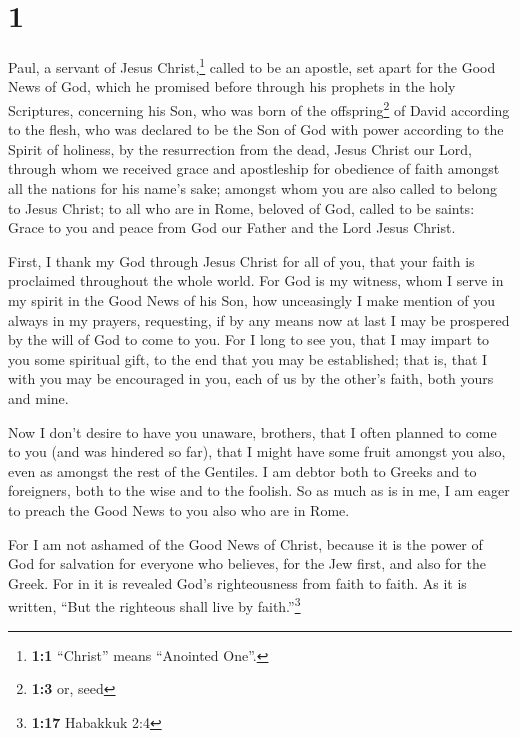 \hypertarget{section}{%
\section{1}\label{section}}

 Paul, a servant of Jesus Christ,\footnote{\textbf{1:1}
  ``Christ'' means ``Anointed One''.} called to be an apostle, set apart
for the Good News of God,  which he promised before
through his prophets in the holy Scriptures,  concerning
his Son, who was born of the offspring\footnote{\textbf{1:3} or, seed}
of David according to the flesh,  who was declared to be
the Son of God with power according to the Spirit of holiness, by the
resurrection from the dead, Jesus Christ our Lord, 
through whom we received grace and apostleship for obedience of faith
amongst all the nations for his name's sake;  amongst whom
you are also called to belong to Jesus Christ;  to all who
are in Rome, beloved of God, called to be saints: Grace to you and peace
from God our Father and the Lord Jesus Christ.

 First, I thank my God through Jesus Christ for all of
you, that your faith is proclaimed throughout the whole world.
 For God is my witness, whom I serve in my spirit in the
Good News of his Son, how unceasingly I make mention of you always in my
prayers,  requesting, if by any means now at last I may
be prospered by the will of God to come to you.  For I
long to see you, that I may impart to you some spiritual gift, to the
end that you may be established;  that is, that I with
you may be encouraged in you, each of us by the other's faith, both
yours and mine.

 Now I don't desire to have you unaware, brothers, that I
often planned to come to you (and was hindered so far), that I might
have some fruit amongst you also, even as amongst the rest of the
Gentiles.  I am debtor both to Greeks and to foreigners,
both to the wise and to the foolish.  So as much as is in
me, I am eager to preach the Good News to you also who are in Rome.

 For I am not ashamed of the Good News of Christ, because
it is the power of God for salvation for everyone who believes, for the
Jew first, and also for the Greek.  For in it is revealed
God's righteousness from faith to faith. As it is written, ``But the
righteous shall live by faith.''\footnote{\textbf{1:17} Habakkuk 2:4}

